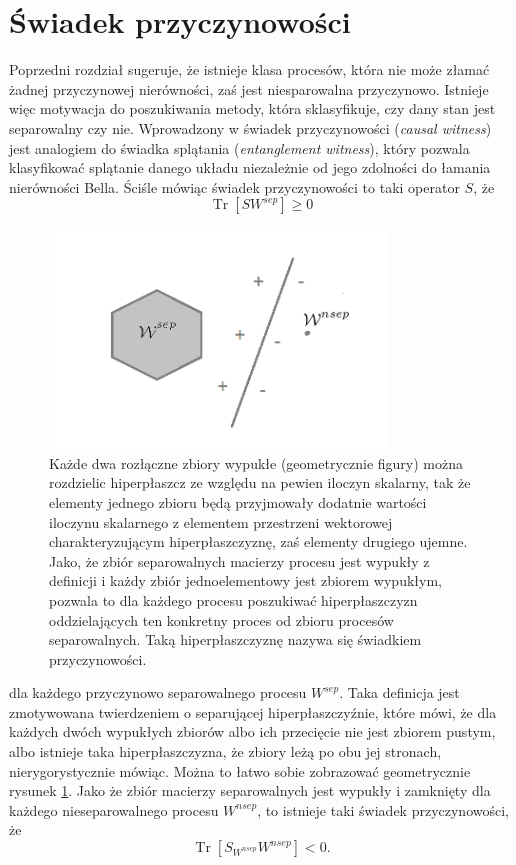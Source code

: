 \documentclass[10pt]{article} %
\DeclareMathOperator{\Trs}{Tr}
\begin{document}
\section{Świadek przyczynowości} 
Poprzedni rozdział sugeruje, że istnieje klasa procesów, która nie może złamać żadnej przyczynowej nierówności, zaś jest niesparowalna przyczynowo. Istnieje więc motywacja do poszukiwania metody, która sklasyfikuje, czy dany stan jest separowalny czy nie. Wprowadzony w \cite{causal_witness}
świadek przyczynowości (\textit{causal witness}) jest analogiem do świadka splątania (\textit{entanglement witness}), który pozwala klasyfikować splątanie danego układu niezależnie od jego zdolności do łamania nierówności Bella. Ściśle mówiąc świadek przyczynowości to taki operator $S$, że
\begin{equation}
\label{eq:witness_gez}
\Trs\left[S W^{sep} \right]\geq 0
\end{equation}
\begin{figure}[t]
\centering
\includegraphics[width=0.8\textwidth]{obrazki/hip}
\caption{Każde dwa rozłączne zbiory wypukłe (geometrycznie figury) można rozdzielic hiperpłaszcz ze względu na pewien iloczyn skalarny, tak że elementy jednego zbioru będą przyjmowały dodatnie wartości iloczynu skalarnego z elementem przestrzeni wektorowej charakteryzującym hiperpłaszczyznę, zaś elementy drugiego ujemne. Jako, że zbiór separowalnych macierzy procesu jest wypukły z definicji i każdy zbiór jednoelementowy jest zbiorem wypukłym, pozwala to dla każdego procesu poszukiwać hiperpłaszczyzn oddzielających ten konkretny proces od zbioru procesów separowalnych. Taką hiperpłaszczyznę nazywa się świadkiem przyczynowości.
}
\label{fig:hip}
\end{figure}
dla każdego przyczynowo separowalnego procesu $W^{sep}$. Taka definicja jest zmotywowana twierdzeniem o separującej hiperpłaszczyźnie, które mówi, że dla każdych dwóch wypukłych zbiorów albo ich przecięcie nie jest zbiorem pustym, albo istnieje taka hiperpłaszczyzna, że zbiory leżą po obu jej stronach, nierygorystycznie mówiąc. Można to łatwo sobie zobrazować geometrycznie rysunek \ref{fig:hip}. Jako że zbiór macierzy separowalnych jest wypukły i zamknięty dla każdego nieseparowalnego procesu $W^{nsep}$, to istnieje taki świadek przyczynowości, że 
\begin{equation}
\Trs \left[ S_{W^{nsep}} W^{nsep} \right] < 0.
\end{equation}
\end{document}
